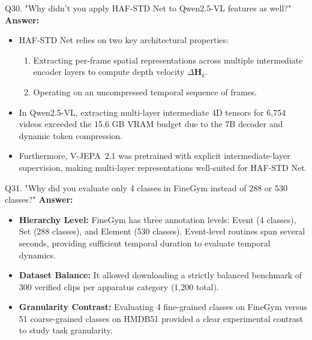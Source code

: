 \documentclass[a4paper, 11pt]{article}
\begin{document}
\begin{questionbox}{Q30. "Why didn't you apply HAF-STD Net to Qwen2.5-VL features as well?"}
\textbf{Answer:}
\begin{itemize}
    \item HAF-STD Net relies on two key architectural properties:
    \begin{enumerate}
        \item Extracting per-frame spatial representations across multiple intermediate encoder layers to compute depth velocity $\Delta \mathbf{H}_k$.
        \item Operating on an uncompressed temporal sequence of frames.
    \end{enumerate}
    \item In Qwen2.5-VL, extracting multi-layer intermediate 4D tensors for 6,754 videos exceeded the 15.6 GB VRAM budget due to the 7B decoder and dynamic token compression.
    \item Furthermore, V-JEPA~2.1 was pretrained with explicit intermediate-layer supervision, making multi-layer representations well-suited for HAF-STD Net.
\end{itemize}
\end{questionbox}

\begin{questionbox}{Q31. "Why did you evaluate only 4 classes in FineGym instead of 288 or 530 classes?"}
\textbf{Answer:}
\begin{itemize}
    \item \textbf{Hierarchy Level:} FineGym has three annotation levels: Event (4 classes), Set (288 classes), and Element (530 classes). Event-level routines span several seconds, providing sufficient temporal duration to evaluate temporal dynamics.
    \item \textbf{Dataset Balance:} It allowed downloading a strictly balanced benchmark of 300 verified clips per apparatus category (1,200 total).
    \item \textbf{Granularity Contrast:} Evaluating 4 fine-grained classes on FineGym versus 51 coarse-grained classes on HMDB51 provided a clear experimental contrast to study task granularity.
\end{itemize}
\end{questionbox}
\end{document}
